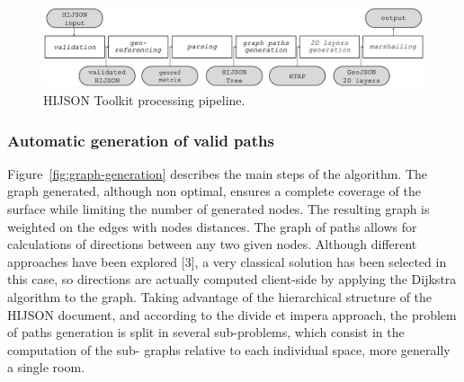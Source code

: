 \documentclass[]{egpubl}
\begin{document}
\begin{figure}[h]
 \centering
 \includegraphics[width=\linewidth]{images/pipeline}
 \caption{HIJSON Toolkit processing pipeline.}
 \label{fig:pipeline}
\end{figure}


\subsubsection{Automatic generation of valid paths}

Figure~\ref{fig:graph-generation} describes the main steps of the algorithm.
The graph generated, although non optimal, ensures a complete coverage of the
surface while limiting the number of generated nodes. The resulting graph is
weighted on the edges with nodes distances. 
The graph of paths allows for calculations of directions between any two given
nodes. Although different approaches have been explored [3], a very classical
solution has been selected in this case, so directions are actually computed
client-side by applying the Dijkstra algorithm to the graph.
Taking advantage of the hierarchical structure of the HIJSON document, and
according to the divide et impera approach, the problem of paths generation is
split in several sub-problems, which consist in the computation of the sub-
graphs relative to each individual space, more generally a single room.
\end{document}
